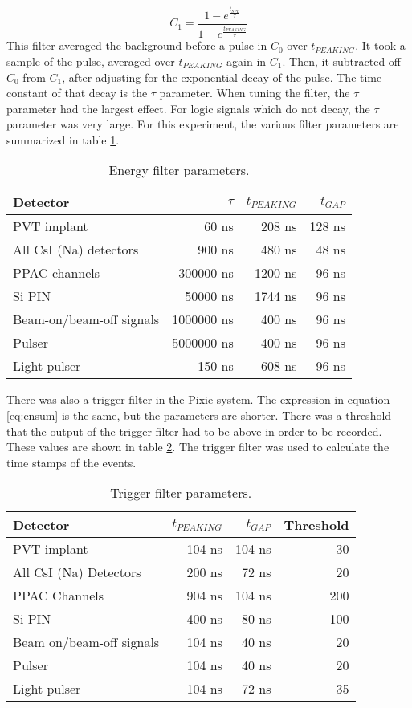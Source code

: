 \documentclass[../MaxHughesThesis.tex]{subfiles}
\begin{document}
\begin{equation}
	C_{1} = \frac{1 - e^{\frac{t_{SPL}}{\tau}}}{1 - e^{\frac{t_{PEAKING}}{\tau}}}
	\label{eq:c1sum}
\end{equation}
%
This filter averaged the background before a pulse in $C_{0}$ over $t_{PEAKING}$.
It took a sample of the pulse, averaged over $t_{PEAKING}$ again in $C_{1}$.
Then, it subtracted off $C_{0}$ from $C_{1}$, after adjusting for the exponential decay of the pulse.
The time constant of that decay is the $\tau$ parameter.
When tuning the filter, the $\tau$ parameter had the largest effect.
For logic signals which do not decay, the $\tau$ parameter was very large.
For this experiment, the various filter parameters are summarized in table \ref{tab:pixieparams}.  
%
\begin{table}[!hbt]
	\centering
	\caption{Energy filter parameters.}
		\begin{tabular}{lrrr} \hline \hline 
			Detector & $\tau$ & $t_{PEAKING}$ & $t_{GAP}$ \\ \hline
			PVT implant & 60 ns & 208 ns & 128 ns \\
			All CsI (Na) detectors & 900 ns & 480 ns & 48 ns \\
			PPAC channels & 300000 ns & 1200 ns & 96 ns \\ 
			Si PIN & 50000 ns & 1744 ns & 96 ns \\
			Beam-on/beam-off signals & 1000000 ns & 400 ns & 96 ns \\
			Pulser & 5000000 ns & 400 ns & 96 ns \\
			Light pulser & 150 ns & 608 ns & 96 ns \\ \hline \hline
		\end{tabular}	
		\label{tab:pixieparams}
\end{table}
%
There was also a trigger filter in the Pixie system.
The expression in equation \ref{eq:ensum} is the same, but the parameters are shorter.
There was a threshold that the output of the trigger filter had to be above in order to be recorded.
These values are shown in table \ref{tab:trigfilter}.
The trigger filter was used to calculate the time stamps of the events.  
%
\begin{table}[!hbt]
	\centering
	\caption{Trigger filter parameters.}
		\begin{tabular}{lrrr} \hline \hline
			Detector & $t_{PEAKING}$ & $t_{GAP}$ & Threshold\\ \hline
			PVT implant & 104 ns & 104 ns & 30 \\ 
			All CsI (Na) Detectors & 200 ns & 72 ns & 20 \\
			PPAC Channels & 904 ns & 104 ns & 200 \\ 
			Si PIN & 400 ns & 80 ns & 100 \\
			Beam on/beam-off signals & 104 ns & 40 ns & 20 \\
			Pulser & 104 ns & 40 ns & 20 \\
			Light pulser & 104 ns & 72 ns & 35 \\ \hline \hline 
		\end{tabular}	
		\label{tab:trigfilter}
\end{table}
%
\end{document}
